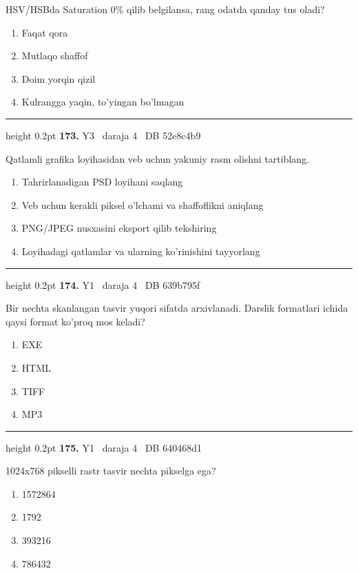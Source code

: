\documentclass[10pt,a4paper,oneside]{article}
\begin{document}
HSV/HSBda Saturation 0\% qilib belgilansa, rang odatda qanday tus oladi?
\begin{enumerate}[label=\Alph*),leftmargin=9mm]
\item Faqat qora
\item Mutlaqo shaffof
\item Doim yorqin qizil
\item Kulrangga yaqin, to'yingan bo'lmagan
\end{enumerate}
\vspace{2mm}\hrule height 0.2pt \vspace{4mm}
\hypertarget{q173}{\textbf{\color{ink}173.}}  {\color{muted}\scriptsize Y3 \textbullet\ daraja 4 \textbullet\ DB 52e8c4b9}
\par
Qatlamli grafika loyihasidan veb uchun yakuniy rasm olishni tartiblang.
\begin{enumerate}[label=\Alph*),leftmargin=9mm]
\item Tahrirlanadigan PSD loyihani saqlang
\item Veb uchun kerakli piksel o'lchami va shaffoflikni aniqlang
\item PNG/JPEG nusxasini eksport qilib tekshiring
\item Loyihadagi qatlamlar va ularning ko'rinishini tayyorlang
\end{enumerate}
\vspace{2mm}\hrule height 0.2pt \vspace{4mm}
\hypertarget{q174}{\textbf{\color{ink}174.}}  {\color{muted}\scriptsize Y1 \textbullet\ daraja 4 \textbullet\ DB 639b795f}
\par
Bir nechta skanlangan tasvir yuqori sifatda arxivlanadi. Darslik formatlari ichida qaysi format ko'proq mos keladi?
\begin{enumerate}[label=\Alph*),leftmargin=9mm]
\item EXE
\item HTML
\item TIFF
\item MP3
\end{enumerate}
\vspace{2mm}\hrule height 0.2pt \vspace{4mm}
\hypertarget{q175}{\textbf{\color{ink}175.}}  {\color{muted}\scriptsize Y1 \textbullet\ daraja 4 \textbullet\ DB 640468d1}
\par
1024x768 pikselli rastr tasvir nechta pikselga ega?
\begin{enumerate}[label=\Alph*),leftmargin=9mm]
\item 1572864
\item 1792
\item 393216
\item 786432
\end{enumerate}
\end{document}
